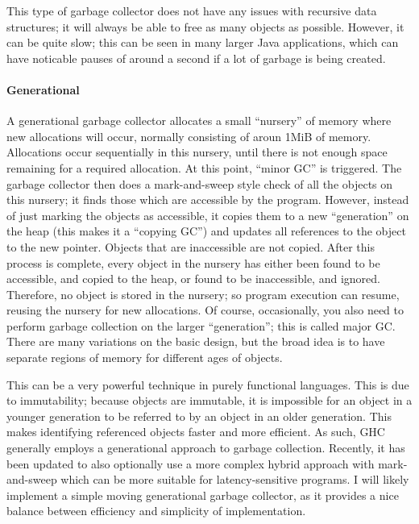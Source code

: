 \documentclass[9pt]{extarticle}
\begin{document}
This type of garbage collector does not have any issues with recursive
data structures; it will always be able to free as many objects as
possible. However, it can be quite slow; this can be seen in many larger
Java applications, which can have noticable pauses of around a second if
a lot of garbage is being created.

\paragraph{Generational}

A generational garbage collector allocates a small ``nursery'' of memory
where new allocations will occur, normally consisting of aroun 1MiB of
memory. Allocations occur sequentially in this nursery, until there is
not enough space remaining for a required allocation. At this point,
``minor GC'' is triggered. The garbage collector then does a
mark-and-sweep style check of all the objects on this nursery; it finds
those which are accessible by the program. However, instead of just
marking the objects as accessible, it copies them to a new
``generation'' on the heap (this makes it a ``copying GC'') and updates
all references to the object to the new pointer. Objects that are
inaccessible are not copied. After this process is complete, every
object in the nursery has either been found to be accessible, and copied
to the heap, or found to be inaccessible, and ignored. Therefore, no
object is stored in the nursery; so program execution can resume,
reusing the nursery for new allocations. Of course, occasionally, you
also need to perform garbage collection on the larger ``generation'';
this is called major GC. There are many variations on the basic design,
but the broad idea is to have separate regions of memory for different
ages of objects.

This can be a very powerful technique in purely functional languages.
This is due to immutability; because objects are immutable, it is
impossible for an object in a younger generation to be referred to by an
object in an older generation. This makes identifying referenced objects
faster and more efficient. As such, GHC generally employs a generational
approach to garbage collection. Recently, it has been updated to also
optionally use a more complex hybrid approach with mark-and-sweep which
can be more suitable for latency-sensitive programs. I will likely
implement a simple moving generational garbage collector, as it provides
a nice balance between efficiency and simplicity of implementation.
\end{document}

